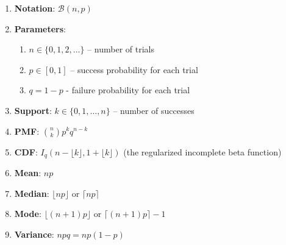 \begin{enumerate}
    \item \textbf{Notation}: 
    $
         {\displaystyle \mathcal{B}(n,p)}
    $
    \hfill \cite{wiki/Binomial_distribution}

    \item \textbf{Parameters}:
    \begin{enumerate}
        \item ${\displaystyle n\in \{0,1,2,\ldots \}}$ – number of trials
        \hfill \cite{wiki/Binomial_distribution}
        
        \item ${\displaystyle p\in [0,1]}$ – success probability for each trial
        \hfill \cite{wiki/Binomial_distribution}
        
        \item ${\displaystyle q=1-p}$ - failure probability for each trial
        \hfill \cite{wiki/Binomial_distribution}
    \end{enumerate} 
    \hfill \cite{wiki/Binomial_distribution}

    \item \textbf{Support}: 
     ${\displaystyle k\in \{0,1,\ldots ,n\}}$ – number of successes
    \hfill \cite{wiki/Binomial_distribution}

    \item \textbf{PMF}:
    $ 
         {\displaystyle {\binom {n}{k}}p^{k}q^{n-k}}
    $
    \hfill \cite{wiki/Binomial_distribution}

    \item \textbf{CDF}:
     ${\displaystyle I_{q}(n-\lfloor k\rfloor ,1+\lfloor k\rfloor )}$ (the regularized incomplete beta function)
    \hfill \cite{wiki/Binomial_distribution}

    \item \textbf{Mean}: 
    $ 
         {\displaystyle np}
    $
    \hfill \cite{wiki/Binomial_distribution}

    \item \textbf{Median}: 
    ${\displaystyle \lfloor np\rfloor }$ or ${\displaystyle \lceil np\rceil }$
    \hfill \cite{wiki/Binomial_distribution}

    \item \textbf{Mode}: 
     ${\displaystyle \lfloor (n+1)p\rfloor }$ or ${\displaystyle \lceil (n+1)p\rceil -1}$
    \hfill \cite{wiki/Binomial_distribution}

    \item \textbf{Variance}: 
    $ 
         {\displaystyle npq=np(1-p)}
    $
    \hfill \cite{wiki/Binomial_distribution}


\end{enumerate}
